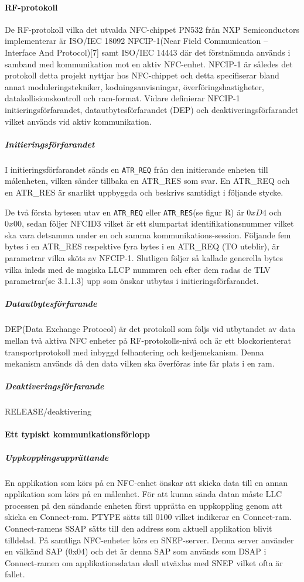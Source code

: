 \documentclass[11pt]{article}
\begin{document}
\paragraph{RF-protokoll}
De RF-protokoll vilka det utvalda NFC-chippet PN532 från NXP Semiconductors implementerar är ISO/IEC 18092 NFCIP-1(Near Field Communication – Interface And Protocol)[7] samt ISO/IEC 14443 där det förstnämnda används i samband med kommunikation mot en aktiv NFC-enhet. NFCIP-1 är således det protokoll detta projekt nyttjar hos NFC-chippet och detta specifiserar bland annat moduleringstekniker, kodningsanvisningar, överföringshastigheter, datakollisionskontroll och ram-format. Vidare definierar NFCIP-1 initieringsförfarandet, datautbytesförfarandet (DEP) och deaktiveringsförfarandet vilket används vid aktiv kommunikation.

\subparagraph{Initieringsförfarandet}
I initieringsförfarandet sänds en \texttt{ATR\_REQ} från den initierande enheten till målenheten, vilken sänder tillbaka en ATR\_RES som svar. En ATR\_REQ och en ATR\_RES är snarlikt uppbyggda och beskrivs samtidigt i följande stycke.

De två första bytesen utav en \texttt{ATR\_REQ} eller \texttt{ATR\_RES}(se figur R) är $0xD4$ och $0x00$, sedan följer NFCID3 vilket är ett slumpartat identifikationsnummer vilket ska vara detsamma under en och samma kommunikations-session. Följande fem bytes i en ATR\_RES respektive fyra bytes i en ATR\_REQ (TO uteblir), är parametrar vilka sköts av NFCIP-1. Slutligen följer så kallade generella bytes vilka inleds med de magiska LLCP nummren och efter dem radas de TLV parametrar(se 3.1.1.3) upp som önskar utbytas i initieringsförfarandet.


\subparagraph{Datautbytesförfarande}
DEP(Data Exchange Protocol) är det protokoll som följs vid utbytandet av data mellan två aktiva NFC enheter på RF-protokolls-nivå och är ett blockorienterat transportprotokoll med inbyggd felhantering och kedjemekanism. Denna mekanism används då den data vilken ska överföras inte får plats i en ram.

\subparagraph{Deaktiveringsförfarande}
RELEASE/deaktivering

\paragraph{Ett typiskt kommunikationsförlopp}
\subparagraph{Uppkopplingsupprättande}
En applikation som körs på en NFC-enhet önskar att skicka data till en annan applikation som körs på en målenhet. För att kunna sända datan måste LLC processen på den sändande enheten först upprätta en uppkoppling genom att skicka en Connect-ram. PTYPE sätts till 0100 vilket indikerar en Connect-ram. Connect-ramens SSAP sätts till den address som aktuell applikation blivit tilldelad. På samtliga NFC-enheter körs en SNEP-server. Denna server använder en välkänd SAP (0x04) och det är denna SAP som används som DSAP i Connect-ramen om applikationsdatan skall utväxlas med SNEP vilket ofta är fallet. 
\end{document}

